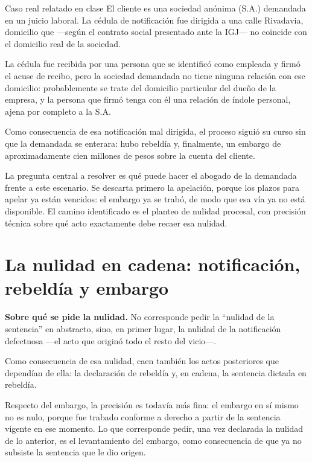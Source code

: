 \documentclass[12pt,oneside]{book}
\begin{document}
\begin{example}{Caso real relatado en clase}
El cliente es una sociedad anónima (S.A.) demandada en un juicio laboral. La cédula de notificación fue dirigida a una calle Rivadavia, domicilio que ---según el contrato social presentado ante la IGJ--- no coincide con el domicilio real de la sociedad.

La cédula fue recibida por una persona que se identificó como empleada y firmó el acuse de recibo, pero la sociedad demandada no tiene ninguna relación con ese domicilio: probablemente se trate del domicilio particular del dueño de la empresa, y la persona que firmó tenga con él una relación de índole personal, ajena por completo a la S.A.

Como consecuencia de esa notificación mal dirigida, el proceso siguió su curso sin que la demandada se enterara: hubo rebeldía y, finalmente, un embargo de aproximadamente cien millones de pesos sobre la cuenta del cliente.
\end{example}

La pregunta central a resolver es qué puede hacer el abogado de la demandada frente a este escenario. Se descarta primero la apelación, porque los plazos para apelar ya están vencidos: el embargo ya se trabó, de modo que esa vía ya no está disponible. El camino identificado es el planteo de nulidad procesal, con precisión técnica sobre qué acto exactamente debe recaer esa nulidad.

\section{La nulidad en cadena: notificación, rebeldía y embargo}

\begin{important}
\textbf{Sobre qué se pide la nulidad.} No corresponde pedir la ``nulidad de la sentencia'' en abstracto, sino, en primer lugar, la nulidad de la notificación defectuosa ---el acto que originó todo el resto del vicio---.

Como consecuencia de esa nulidad, caen también los actos posteriores que dependían de ella: la declaración de rebeldía y, en cadena, la sentencia dictada en rebeldía.

Respecto del embargo, la precisión es todavía más fina: el embargo en sí mismo no es nulo, porque fue trabado conforme a derecho a partir de la sentencia vigente en ese momento. Lo que corresponde pedir, una vez declarada la nulidad de lo anterior, es el levantamiento del embargo, como consecuencia de que ya no subsiste la sentencia que le dio origen.
\end{important}
\end{document}
